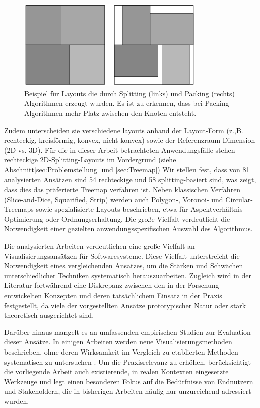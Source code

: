 \begin{figure}
    \centering
    \includegraphics[width=0.8\textwidth]{images/verwandte/packingVsSplitting.png}
    \caption{Beispiel für Layouts die durch Splitting (links) und Packing (rechts) Algorithmen erzeugt wurden. Es ist zu erkennen, dass bei Packing-Algorithmen mehr Platz zwischen den Knoten entsteht. \cite[3]{scheibel2020survey}}
    \label{fig:packingVsSplitting}
\end{figure}

Zudem unterscheiden sie verschiedene layouts anhand der Layout-Form (z.,B. rechteckig, kreisförmig, konvex, nicht-konvex) sowie der Referenzraum-Dimension (2D vs. 3D). Für die in dieser Arbeit betrachteten Anwendungsfälle stehen rechteckige 2D-Splitting-Layouts im Vordergrund (siehe Abschnitt\ref{sec:Problemstellung} und \ref{sec:Treemap}) Wir stellen fest, dass von 81 analysierten Ansätzen sind 54 rechteckige und 58 splitting-basiert sind, was zeigt, dass dies das präferierte Treemap verfahren ist. 
Neben klassischen Verfahren (Slice-and-Dice, Squarified, Strip) werden auch Polygon-, Voronoi- und Circular-Treemaps sowie spezialisierte Layouts beschrieben, etwa für Aspektverhältnis-Optimierung oder Ordnungserhaltung. Die große Vielfalt verdeutlicht die Notwendigkeit einer gezielten anwendungsspezifischen Auswahl des Algorithmus.

\smallskip

Die analysierten Arbeiten verdeutlichen eine große Vielfalt an Visualisierungsansätzen für Softwaresysteme. Diese Vielfalt unterstreicht die Notwendigkeit eines vergleichenden Ansatzes, um die Stärken und Schwächen unterschiedlicher Techniken systematisch herauszuarbeiten. Zugleich wird in der Literatur fortwährend eine Diskrepanz zwischen den in der Forschung entwickelten Konzepten und deren tatsächlichem Einsatz in der Praxis festgestellt, da viele der vorgestellten Ansätze prototypischer Natur oder stark theoretisch ausgerichtet sind\cite{overview3D, staticSurvey}.

Darüber hinaus mangelt es an umfassenden empirischen Studien zur Evaluation dieser Ansätze. In einigen Arbeiten werden neue Visualisierungsmethoden beschrieben, ohne deren Wirksamkeit im Vergleich zu etablierten Methoden systematisch zu untersuchen \cite{overview3D, scheibel2020survey, visualizationEvolution}. Um die Praxisrelevanz zu erhöhen, berücksichtigt die vorliegende Arbeit auch existierende, in realen Kontexten eingesetzte Werkzeuge und legt einen besonderen Fokus auf die Bedürfnisse von Endnutzern und Stakeholdern, die in bisherigen Arbeiten häufig nur unzureichend adressiert wurden\cite{bassil2001software, pacione2003comparative}.


